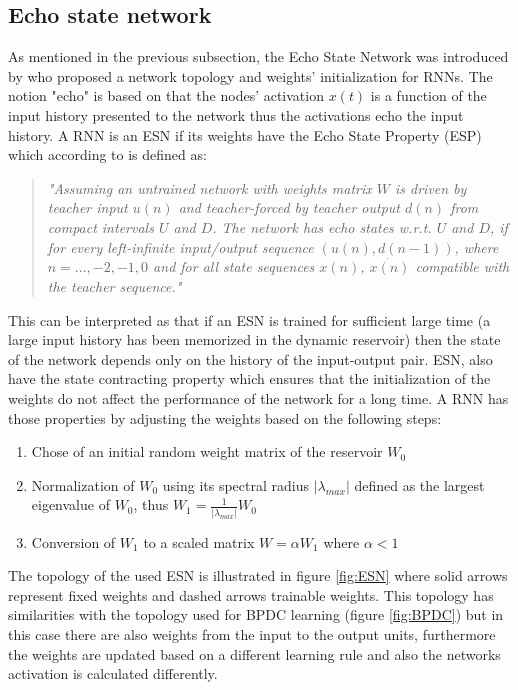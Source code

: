 \documentclass[msc,ai,logo]{infthesis}
\begin{document}
\subsection{Echo state network}
As mentioned in the previous subsection, the Echo State Network was introduced by \cite{jaeger} who proposed a network topology and weights' initialization for RNNs. The notion "echo" is based on that the nodes' activation $x(t)$ is a function of the input history presented to the network \citep{jaeger2} thus the activations echo the input history. A RNN is an ESN if its weights have the Echo State Property (ESP) which according to \cite{jaeger2002} is defined as:
\begin{quotation}
 \textit{"Assuming an untrained network with weights matrix $W$ is driven by teacher input $u(n)$ and teacher-forced by teacher
output $d(n)$ from compact intervals $U$ and $D$. The network has echo states w.r.t. $U $ and $D$, if for every left-infinite input/output sequence $(u(n), 
d(n-1))$, where $n = ..., -2,-1,0$ and for all state sequences $x(n)$, $\dot{x(n)}$ compatible
with the teacher sequence."}
\end{quotation}

This can be interpreted as that if an ESN is trained for sufficient large time (a large input history has been memorized in the dynamic reservoir) then the state of the network depends only on the history of the input-output pair. ESN, also have the state contracting property which ensures that the initialization of the weights do not affect the performance of the network for a long time. A RNN has those properties by adjusting the weights based on the following steps:
\\
\begin{enumerate}
\item Chose of an initial random weight matrix of the reservoir $W_0$
\item Normalization of $W_0$ using its spectral radius $|\lambda_{max}|$ defined as the largest eigenvalue of $W_0$, thus $W_1=\frac{1}{|\lambda_{max}|}W_0$
\item Conversion of $W_1$ to a scaled matrix  $W=\alpha W_1$ where $\alpha<1$
\end{enumerate} 

The topology of the used ESN is illustrated in figure \ref{fig:ESN} where solid arrows represent fixed weights and dashed arrows trainable weights.
This topology has similarities with the topology used for BPDC learning (figure \ref{fig:BPDC}) but in this case there are also weights from the input to the output units, furthermore the weights are updated based on a different learning rule and also the networks activation is calculated differently. 
 
\end{document}
